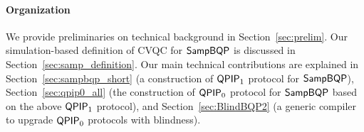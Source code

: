 \paragraph{Organization}
We provide preliminaries on technical background in Section~\ref{sec:prelim}. 
Our simulation-based definition of CVQC for $\operatorname{\mathsf{SampBQP}}$ is discussed in Section~\ref{sec:samp_definition}. 
Our main technical contributions are explained in Section~\ref{sec:sampbqp_short} (a construction of $\operatorname{\mathsf{QPIP}}_1$ protocol for $\operatorname{\mathsf{SampBQP}}$), 
Section~\ref{sec:qpip0_all} (the construction of $\operatorname{\mathsf{QPIP}}_0$ protocol for $\operatorname{\mathsf{SampBQP}}$ based on the above $\operatorname{\mathsf{QPIP}}_1$ protocol), 
and Section~\ref{sec:BlindBQP2} (a generic compiler to upgrade $\operatorname{\mathsf{QPIP}}_0$ protocols with blindness). 
